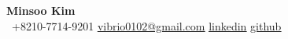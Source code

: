 \begin{center}
    \textbf{\Huge Minsoo Kim} \\ \vspace{1pt} %
     \ \small +8210-7714-9201 \quad
    \href{mailto:vibrio0102@gmail.com}{ \underline{vibrio0102@gmail.com}} \quad
    \href{https://www.linkedin.com/in/minsoo-kim-167405131}{ \underline{linkedin}} \quad
    \href{https://github.com/msk-psp}{ \underline{github}}
\end{center}

